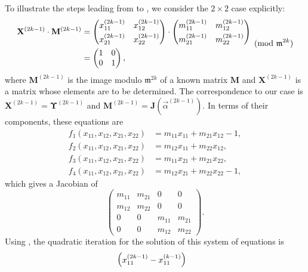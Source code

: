 {To illustrate the steps leading from  to
, we consider the $2 \times 2$ case explicitly:
\[
\begin{aligned}
\mathbf{X}^{(2k-1)} \cdot \mathbf{M}^{(2k-1)} 
& = 
\begin{pmatrix}x_{11}^{(2k-1)} & x_{12}^{(2k-1)} \\\noalign{\vskip3pt}
x_{21}^{(2k-1)} & x_{22}^{(2k-1)} \end{pmatrix} 
\cdot
\begin{pmatrix}m_{11}^{(2k-1)} & m_{12}^{(2k-1)} \\\noalign{\vskip3pt}
m_{21}^{(2k-1)} & m_{22}^{(2k-1)} \end{pmatrix} \\
& = \begin{pmatrix}1& 0 \\ 0 & 1 \end{pmatrix},
\end{aligned}
\pmod{\mathfrak{m}^{2k}}
\]
where $\mathbf{M}^{(2k-1)}$ is the image modulo $\mathfrak{m}^{2k}$ of a
known matrix $\mathbf{M}$ and $\mathbf{X}^{(2k-1)}$ is a matrix whose elements
are to be determined.  The correspondence to our case is
$\mathbf{X}^{(2k-1)} = \mathbf{\Upsilon}^{(2k-1)}$ and $\mathbf{M}^{(2k-1)} =
\mathbf{J}(\vec{\alpha}^{(2k-1)})$. In terms of their components, these
equations are 
\[
\begin{aligned}
 f_1(x_{11}, x_{12}, x_{21}, x_{22}) & 
   = m_{11} x_{11} + m_{21} x_{12} - 1, \\
 f_2(x_{11}, x_{12}, x_{21}, x_{22}) & 
   = m_{12} x_{11} + m_{22} x_{12}, \\ 
 f_3(x_{11}, x_{12}, x_{21}, x_{22}) & 
   = m_{11} x_{21} + m_{21} x_{22}, \\ 
 f_4(x_{11}, x_{12}, x_{21}, x_{22}) & 
   = m_{12} x_{21} + m_{22} x_{22} - 1,
\end{aligned}
\]
which gives a Jacobian of 
\[
\begin{pmatrix}
   m_{11} & m_{21} & 0 & 0 \\
   m_{12} & m_{22} & 0 & 0 \\
   0 & 0 & m_{11} & m_{21} \\
   0 & 0 & m_{12} & m_{22} \end{pmatrix}.
\]
Using , the quadratic iteration for the solution
of this system of equations is
\[
\begin{aligned}
\null & \begin{pmatrix}
  x_{11}^{(2k-1)} - x_{11}^{(k-1)} \\

\end{pmatrix}
\end{aligned}\]}
